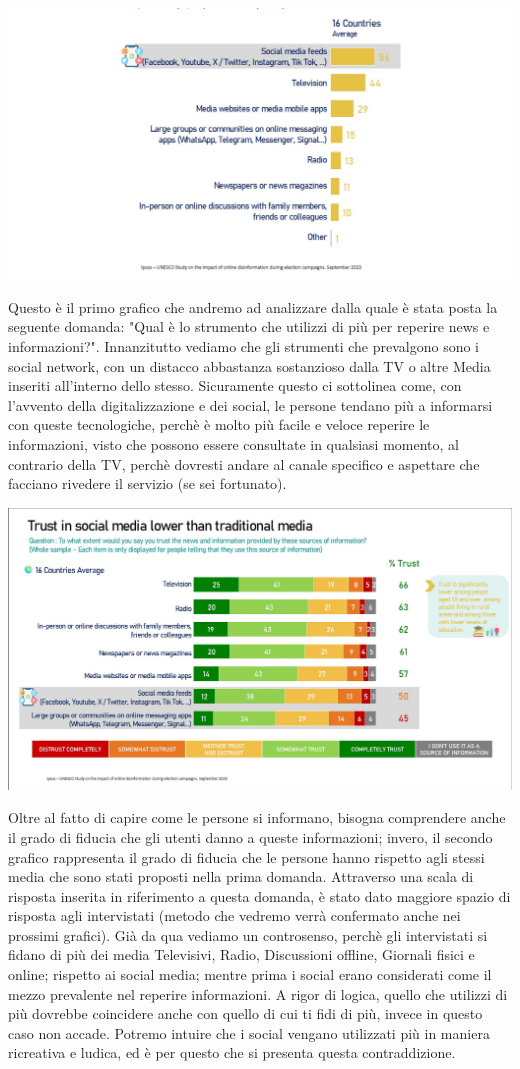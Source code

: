 \documentclass{article}
\begin{document}
\centering\includegraphics[width=0.5\linewidth]{Immagini/Grafico1.jpg}\\
    \begin{justify}
    Questo è il primo grafico che andremo ad analizzare dalla quale è stata posta la seguente domanda: "Qual è lo strumento che utilizzi di più per reperire news e informazioni?".
    Innanzitutto vediamo che gli strumenti che prevalgono sono i social network, con un distacco abbastanza sostanzioso dalla TV o altre Media inseriti all'interno dello stesso. Sicuramente questo ci sottolinea come, con l'avvento della digitalizzazione e dei social, le persone tendano più a informarsi con queste tecnologiche, perchè è molto più facile e veloce reperire le informazioni, visto che possono essere consultate in qualsiasi momento, al contrario della TV, perchè dovresti andare al canale specifico e aspettare che facciano rivedere il servizio (se sei fortunato).
\begin{center}
    \includegraphics[width=0.5\linewidth]{Immagini/Grafico2.jpg}\\
\end{center}
    Oltre al fatto di capire come le persone si informano, bisogna comprendere anche il grado di fiducia che gli utenti danno a queste informazioni; invero, il secondo grafico rappresenta il grado di fiducia che le persone hanno rispetto agli stessi media che sono stati proposti nella prima domanda.
    Attraverso una scala di risposta inserita in riferimento a questa domanda, è stato dato maggiore spazio di risposta agli intervistati (metodo che vedremo verrà confermato anche nei prossimi grafici).
    Già da qua vediamo un controsenso, perchè gli intervistati si fidano di più dei media Televisivi, Radio, Discussioni offline, Giornali fisici e online; rispetto ai social media; mentre prima i social erano considerati come il mezzo prevalente nel reperire informazioni. A rigor di logica, quello che utilizzi di più dovrebbe coincidere anche con quello di cui ti fidi di più, invece in questo caso non accade. Potremo intuire che i social vengano utilizzati più in maniera ricreativa e ludica, ed è per questo che si presenta questa contraddizione.
    \end{justify}
\end{document}
